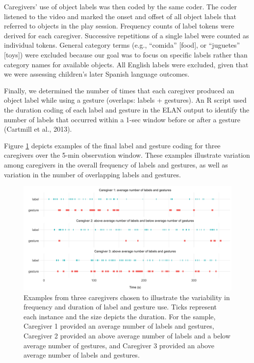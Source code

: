 \documentclass[
  english,
  man,floatsintext]{apa6}
\begin{document}
Caregivers' use of object labels was then coded by the same coder. The coder listened to the video and marked the onset and offset of all object labels that referred to objects in the play session. Frequency counts of label tokens were derived for each caregiver. Successive repetitions of a single label were counted as individual tokens. General category terms (e.g., \enquote{comida} {[}food{]}, or \enquote{juguetes} {[}toys{]}) were excluded because our goal was to focus on specific labels rather than category names for available objects. All English labels were excluded, given that we were assessing children's later Spanish language outcomes.

Finally, we determined the number of times that each caregiver produced an object label while using a gesture (overlaps: labels + gestures). An R script used the duration coding of each label and gesture in the ELAN output to identify the number of labels that occurred within a 1-sec window before or after a gesture (Cartmill et al., 2013).

Figure \ref{fig:fig1} depicts examples of the final label and gesture coding for three caregivers over the 5-min observation window. These examples illustrate variation among caregivers in the overall frequency of labels and gestures, as well as variation in the number of overlapping labels and gestures.

\begin{figure}
\includegraphics[width=1\linewidth]{../stats/figures/fig.durations} \caption{Examples from three caregivers chosen to illustrate the variability in frequency and duration of label and gesture use.  Ticks represent each instance and the size depicts the duration. For the sample, Caregiver 1 provided an average number of labels and gestures, Caregiver 2 provided an above average number of labels and a below average number of gestures, and Caregiver 3 provided an above average number of labels and gestures.}\label{fig:fig1}
\end{figure}
\end{document}
